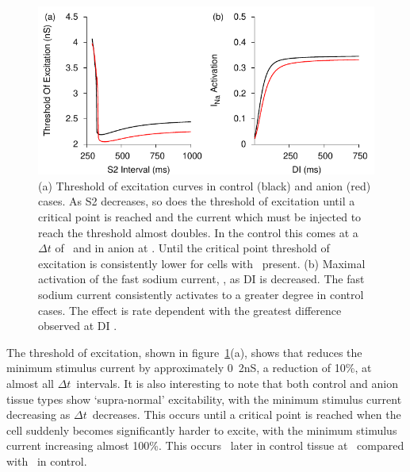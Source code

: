 \begin{figure}
\begin{center}
\includegraphics{figures/toolkit/anion/figures/04_ToE}
\end{center}
\caption[Anion Sensitive Threshold Of Excitation and  activation]{
\label{fig:toolkit:anion:toe}
(a)
Threshold of excitation curves in control (black) and
anion (red) cases.
As S2 decreases, so does the threshold of excitation until a critical point is
reached and the current which must be injected to reach the threshold almost
doubles.
In the control this comes at a $\Delta t$ of
\ and in anion at .
Until the critical point threshold of excitation is consistently lower for cells
with \ present.
(b)
Maximal activation of the fast sodium current, , as DI is decreased.
The fast sodium current consistently activates to a greater degree in control
cases.
The effect is rate dependent with the greatest difference observed at DI .
}
\end{figure}

The threshold of excitation, shown in figure~\ref{fig:toolkit:anion:toe}(a), shows that
 reduces the minimum stimulus current by approximately \unit{0.2}{nS},
a reduction of 10\%, at almost all $\Delta t$\ intervals.  It is also
interesting to note that both control and anion tissue types show `supra-normal'
excitability, with the minimum stimulus current decreasing as $\Delta t$\
decreases.  This occurs until a critical point is reached when the cell suddenly
becomes significantly harder to excite, with the minimum stimulus current
increasing almost 100\%.
This occurs \ later in control tissue at
\, compared with \ in control.

